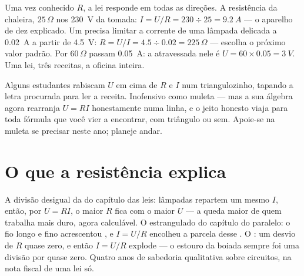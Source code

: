 \begin{example}\label{ex:g8:ohms-law:compute}
Uma vez conhecido $R$, a lei responde em todas as direções. A
resistência da chaleira, $25\,\Omega$ nos \qty{230}{V} da tomada:
$I = U/R = 230 \div 25 = \qty{9.2}{A}$ --- o aparelho de dez 
explicado. Um  precisa limitar a corrente de uma lâmpada
delicada a \qty{0.02}{A} a partir de \qty{4.5}{V}:
$R = U/I = 4.5 \div 0.02 = 225\,\Omega$ --- escolha o próximo valor
padrão. Por $60\,\Omega$ passam \qty{0.05}{A}: a  atravessada
nele é $U = 60 \times 0.05 = \qty{3}{V}$. Uma lei, três receitas, a
oficina inteira.
\end{example}

\begin{remark}\label{rem:g8:ohms-law:triangle}
Alguns estudantes rabiscam $U$ em cima de $R$ e $I$ num
triangulozinho, tapando a letra procurada para ler a receita.
Inofensivo como muleta --- mas a sua álgebra agora rearranja
$U = R I$ honestamente numa linha, e o jeito honesto viaja para toda
fórmula que você vier a encontrar, com triângulo ou sem. Apoie-se na
muleta se precisar neste ano; planeje andar.
\end{remark}

\section{O que a resistência explica}

\begin{example}\label{ex:g8:ohms-law:mysteries}
A divisão desigual da  do capítulo das leis: lâmpadas 
repartem um mesmo $I$, então, por $U = R I$, o maior $R$ fica com o
maior $U$ --- a queda maior de quem trabalha mais duro, agora
calculável. O  estrangulado do capítulo do paralelo: o fio longo
e fino acrescentou , e $I = U/R$ encolheu a parcela desse
. O : um desvio de $R$ quase zero, e então $I = U/R$
explode --- o estouro da boiada sempre foi uma divisão por quase
zero. Quatro anos de sabedoria qualitativa sobre circuitos, na nota
fiscal de uma lei só.
\end{example}

